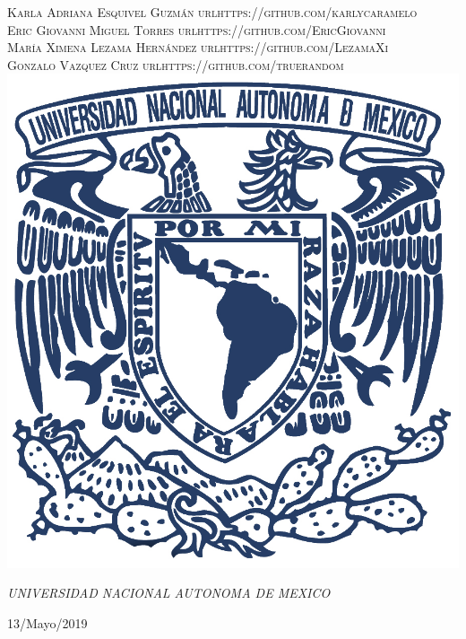 \documentclass[a4paper, 11pt, oneside]{article}
\begin{document}
\begin{titlepage}
	{\scshape\Large Karla Adriana Esquivel Guzmán url{https://github.com/karlycaramelo} \\
    Eric Giovanni Miguel Torres url{https://github.com/EricGiovanni}\\ 
    María Ximena Lezama Hernández url{https://github.com/LezamaXi}\\ 
    Gonzalo Vazquez Cruz url{https://github.com/truerandom}}
	\vspace{0.5\baselineskip} 
	\vfill
	\includegraphics[scale=0.65]{unam.jpg}
	
	\textit{UNIVERSIDAD NACIONAL AUTONOMA DE MEXICO} 
	
	
	
	
	
	\vspace{0.3\baselineskip} 
	
	13/Mayo/2019 
	
	 

\end{titlepage}
\end{document}

